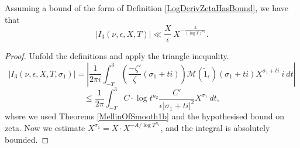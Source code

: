 \begin{lemma}[I3GenBound]
\label{I3GenBound}
\leanok
Assuming a bound of the form of Definition \ref{LogDerivZetaHasBound}, we have that
  $$
  \left|I_3(\nu,\epsilon,X,T)\right|\ll\frac{X}{\epsilon}\, X^{-\frac{A}{(\log T)^{n_1}}}.
  $$
\end{lemma}
\begin{proof}
\leanok
Unfold the definitions and apply the triangle inequality.
  $$
  \left|I_{3}(\nu, \epsilon, X, T, \sigma_1)\right| =
  \left|\frac{1}{2\pi i} \int_{-T}^3
  \left(\frac{-\zeta'}\zeta(\sigma_1 + t i) \right)
  \mathcal M(\widetilde 1_\epsilon)(\sigma_1 + t i)
  X^{\sigma_1 + t i}
  \ i \ dt
  \right|
  $$
  $$\leq
  \frac{1}{2\pi}
  \int_{-T}^3
  C \cdot\log t^{n_2}
  \frac{C'}{\epsilon|\sigma_1 + t i|^2}
  X^{\sigma_1}
   \ dt
  ,
  $$
  where we used Theorems \ref{MellinOfSmooth1b} and the hypothesised bound on zeta.
  Now we estimate $X^{\sigma_1} = X \cdot X^{-A/ \log T^{n_1}}$, and the integral is absolutely bounded.
\end{proof}
